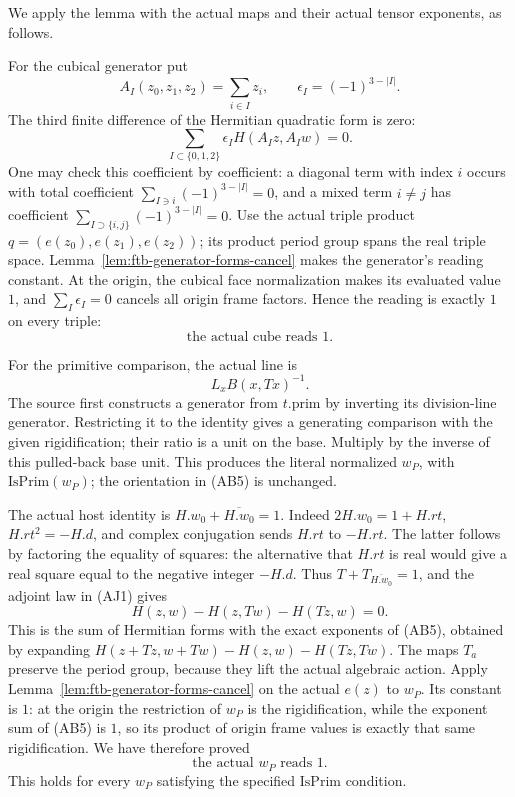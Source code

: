 We apply the lemma with the actual maps and their actual
tensor exponents, as follows.

For the cubical generator put
\[
 A_I(z_0,z_1,z_2)=\sum_{i\in I}z_i,\qquad
                       \epsilon_I=(-1)^{3-|I|}.
\]
The third finite difference of the Hermitian quadratic form is
zero:
\[
                   \sum_{I\subset\{0,1,2\}}
                           \epsilon_IH(A_Iz,A_Iw)=0.      \tag{AB3}
\]
One may check this coefficient by coefficient: a diagonal term
with index \(i\) occurs with total coefficient
\(\sum_{I\ni i}(-1)^{3-|I|}=0\), and a mixed term \(i\ne j\)
has coefficient \(\sum_{I\supset\{i,j\}}(-1)^{3-|I|}=0\).
Use the actual triple product \(q=(e(z_0),e(z_1),e(z_2))\);
its product period group spans the real triple space.
Lemma~\ref{lem:ftb-generator-forms-cancel} makes the generator's
reading constant. At the origin, the cubical face normalization
makes its evaluated value \(1\), and
\(\sum_I\epsilon_I=0\) cancels all origin frame factors.
Hence the reading is exactly \(1\) on every triple:
\[
                        \text{the actual cube reads }1.  \tag{AB4}
\]

For the primitive comparison, the actual line is
\[
                             L_x B(x,Tx)^{-1}.           \tag{AB5}
\]
The source first constructs a generator from \(t.\mathrm{prim}\)
by inverting its division-line generator.
Restricting it to the identity gives a generating comparison
with the given rigidification; their ratio is a unit on the
base. Multiply by the inverse of this pulled-back base unit.
This produces the literal normalized \(w_P\), with
\(\mathrm{IsPrim}(w_P)\); the orientation in (AB5) is unchanged.

The actual host identity is
\(H.w_0+\overline{H.w_0}=1\).
Indeed \(2H.w_0=1+H.rt\), \(H.rt^2=-H.d\), and complex
conjugation sends \(H.rt\) to \(-H.rt\).
The latter follows by factoring the equality of squares:
the alternative that \(H.rt\) is real would give a real
square equal to the negative integer \(-H.d\).
Thus \(T+T_{\overline{H.w_0}}=1\), and the adjoint law in (AJ1)
gives
\[
 H(z,w)-H(z,Tw)-H(Tz,w)=0.                               \tag{AB6}
\]
This is the sum of Hermitian forms with the exact exponents of
(AB5), obtained by expanding
\(H(z+Tz,w+Tw)-H(z,w)-H(Tz,Tw)\).
The maps \(T_a\) preserve the period group, because they lift
the actual algebraic action. Apply
Lemma~\ref{lem:ftb-generator-forms-cancel} on the actual
\(e(z)\) to \(w_P\). Its constant is \(1\):
at the origin the restriction of \(w_P\) is the rigidification,
while the exponent sum of (AB5) is \(1\), so its product of
origin frame values is exactly that same rigidification.
We have therefore proved
\[
                         \text{the actual }w_P\text{ reads }1.
                                                               \tag{AB7}
\]
This holds for every \(w_P\) satisfying the specified
\(\mathrm{IsPrim}\) condition.

